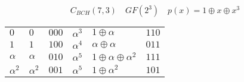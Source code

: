 \documentclass[12pt]{article}
\begin{document}
$$C_{BCH}(7,3) \quad  GF(2^3) \quad p(x)=1\oplus x \oplus x^3 $$

\begin{table}[h]
    \begin{tabular}{llllll}
        $0$ & $0$ & $000$ & $\alpha^3$ & $1 \oplus \alpha $ & $110$ \\
        $1$ & $1$ & $100$ & $\alpha^4$ & $\alpha \oplus \alpha $ & $011$ \\
        $\alpha$ & $\alpha$ & $010$ & $\alpha^5$ & $ 1 \oplus \alpha \oplus \alpha^2 $ & $111$ \\
        $\alpha^2$ & $\alpha^2$ & $001$ & $\alpha^5$ & $ 1 \oplus \alpha^2 $ & $101$ \\
    \end{tabular}
\end{table}
\end{document}
